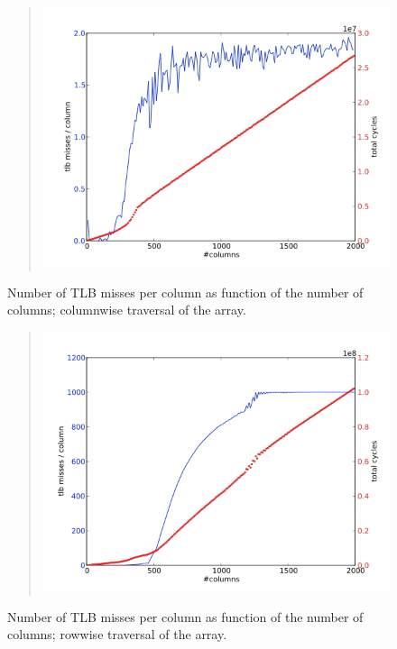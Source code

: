 \begin{figure}[ht]
  \begin{quote}
  \includegraphics[scale=.5]{graphics/tlb_col}
  \end{quote}
  \caption{Number of TLB misses per column as function of the number
    of columns; columnwise traversal of the array.}
  \label{fig:tlb_col}
\end{figure}
\begin{figure}[ht]
  \begin{quote}
  \includegraphics[scale=.5]{graphics/tlb_row}
  \end{quote}
  \caption{Number of TLB misses per column as function of the number
    of columns; rowwise traversal of the array.}
  \label{fig:tlb_row}
\end{figure}

